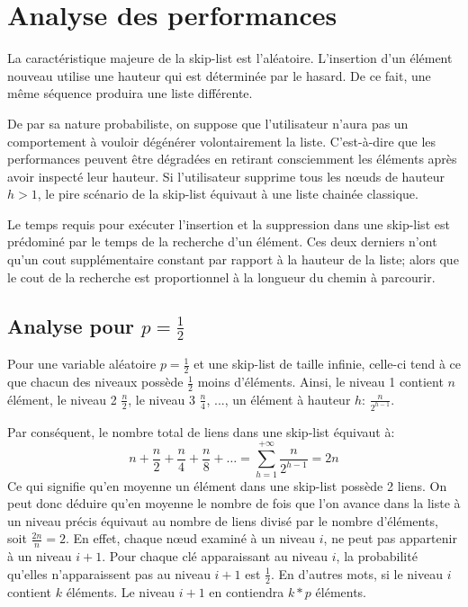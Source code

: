 \documentclass[hidelinks,a4paper, 12pt]{article}
\begin{document}
	\newpage
	\section{Analyse des performances}\label{perf}
	La caractéristique majeure de la skip-list est l'aléatoire. L'insertion d'un élément nouveau utilise une hauteur qui est déterminée par le hasard. De ce fait, une même séquence produira une liste différente.
	
	De par sa nature probabiliste, on suppose que l'utilisateur n'aura pas un comportement à vouloir dégénérer volontairement la liste. C'est-à-dire que les performances peuvent être dégradées en retirant consciemment les éléments après avoir inspecté leur hauteur. Si l'utilisateur supprime tous les nœuds de hauteur $h>1$, le pire scénario de la skip-list équivaut à une liste chainée classique.
	
	Le temps requis pour exécuter l'insertion et la suppression dans une skip-list est prédominé par le temps de la recherche d'un élément. Ces deux derniers n'ont qu'un cout supplémentaire constant par rapport à la hauteur de la liste; alors que le cout de la recherche est proportionnel à la longueur du chemin à parcourir.
	
	
	\subsection{Analyse pour $p=\frac{1}{2}$}
	Pour une variable aléatoire $p=\frac{1}{2}$ et une skip-list de taille infinie, celle-ci tend à ce que chacun des niveaux possède $\frac{1}{2}$ moins d'éléments. Ainsi, le niveau 1 contient $n$ élément, le niveau 2 $\frac{n}{2}$, le niveau 3 $\frac{n}{4}$, ..., un élément à hauteur $h$: $\frac{n}{{2}^{h-1}}$.
	
	Par conséquent, le nombre total de liens dans une skip-list équivaut à: \[n+\frac{n}{2}+\frac{n}{4}+\frac{n}{8}+\dots = \sum_{h=1}^{+\infty}\frac{n}{{2}^{h-1}}=2n\] Ce qui signifie qu'en moyenne un élément dans une skip-list possède 2 liens. On peut donc déduire qu'en moyenne le nombre de fois que l'on avance dans la liste à un niveau précis équivaut au nombre de liens divisé par le nombre d'éléments, soit $\frac{2n}{n}=2$. En effet, chaque nœud examiné à un niveau $i$, ne peut pas appartenir à un niveau $i+1$. Pour chaque clé apparaissant au niveau $i$, la probabilité qu'elles n'apparaissent pas au niveau $i+1$ est $\frac{1}{2}$. En d'autres mots, si le niveau $i$ contient $k$ éléments. Le niveau $i+1$ en contiendra $k*p$ éléments.
	
\end{document}
